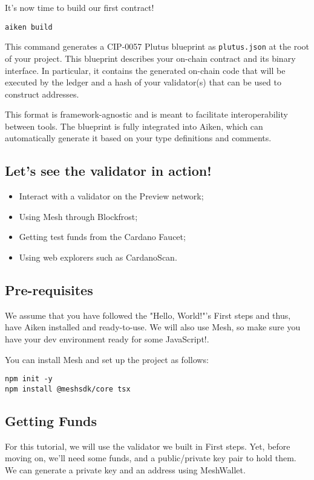 It's now time to build our first contract!

\begin{verbatim}
aiken build
\end{verbatim}

This command generates a CIP-0057 Plutus blueprint as \texttt{plutus.json} at the root of your project. This blueprint describes your on-chain contract and its binary interface. In particular, it contains the generated on-chain code that will be executed by the ledger and a hash of your validator(s) that can be used to construct addresses.

This format is framework-agnostic and is meant to facilitate interoperability between tools. The blueprint is fully integrated into Aiken, which can automatically generate it based on your type definitions and comments.

\subsection{Let's see the validator in action!}

\begin{itemize}
    \item Interact with a validator on the Preview network;
    \item Using Mesh through Blockfrost;
    \item Getting test funds from the Cardano Faucet;
    \item Using web explorers such as CardanoScan.
\end{itemize}

\subsection{Pre-requisites}
We assume that you have followed the "Hello, World!"'s First steps and thus, have Aiken installed and ready-to-use. We will also use Mesh, so make sure you have your dev environment ready for some JavaScript!.

You can install Mesh and set up the project as follows:

\begin{verbatim}
npm init -y
npm install @meshsdk/core tsx
\end{verbatim}

\subsection{Getting Funds}
For this tutorial, we will use the validator we built in First steps. Yet, before moving on, we'll need some funds, and a public/private key pair to hold them. We can generate a private key and an address using MeshWallet.

